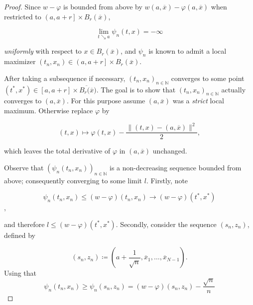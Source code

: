 \begin{lemma}
\begin{proof}
				Since $ w - \varphi $ is bounded from above by $ w(a, \overline{x}) - \varphi(a, \overline{x}) $ when restricted to $ \left( a, a + r \right] \times B_r(\overline{x}) $,
				
				\begin{equation*}
					\lim\limits_{t \searrow a} \psi_n(t, x) = - \infty
				\end{equation*}
				
				\emph{uniformly} with respect to $ x \in B_r(\overline{x}) $, and $ \psi_n $ is known to admit a local maximizer $ (t_n, x_n) \in \left( a, a + r \right] \times B_r(\overline{x}) $.
				
				After taking a subsequence if necessary, $ (t_n, x_n)_{n \in \mathbb{N}} $ converges to some point $ (t^{*}, x^{*}) \in \left[a, a +r \right] \times \overline{B_r(\overline{x}}) $. The goal is to show that $ (t_n, x_n)_{n \in \mathbb{N}} $ actually converges to $ (a, \overline{x}) $. For this purpose assume $ (a, \overline{x}) $ was a \emph{strict} local maximum. Otherwise replace $ \varphi $ by
				
				\begin{equation*}
					(t, x) \mapsto \varphi(t, x) - \frac{\lVert (t, x) - (a, \overline{x}) \rVert^2}{2},
				\end{equation*}
				
				which leaves the total derivative of $ \varphi $ in $ (a, \overline{x}) $ unchanged. 
				
				Observe that $ (\psi_n(t_n, x_n))_{n \in \mathbb{N}} $ is a non-decreasing sequence bounded from above; consequently converging to some limit $ l $. Firstly, note 
				
				\begin{equation*}
					\psi_n(t_n, x_n) \leq (w- \varphi)(t_n, x_n) \to (w-\varphi)(t^{*}, x^{*})
				\end{equation*}, 
				
				and therefore $ l \leq (w-\varphi)(t^{*}, x^{*}) $. Secondly, consider the sequence $ (s_n, z_n) $, defined by
				
				\begin{equation*}
					(s_n, z_n) \coloneqq  \left( a + \frac{1}{\sqrt{n}}, \overline{x}_1, \ldots, \overline{x}_{N-1} \right) .
				\end{equation*}
				Using that
				\begin{equation*}
					\psi_n(t_n, x_n) \geq \psi_n(s_n, z_n) = (w - \varphi)(s_n, z_n) -\frac{\sqrt{n}}{n}
				\end{equation*}
				

\end{proof}
\end{lemma}
